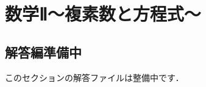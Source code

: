 \documentclass[../../ms_a.tex]{subfiles}
\begin{document}
\setlength{\abovedisplayskip}{2mm}
\setlength{\belowdisplayskip}{1mm}

\section{数学Ⅱ～複素数と方程式～}

\subsection*{解答編準備中}
このセクションの解答ファイルは整備中です．
\end{document}
